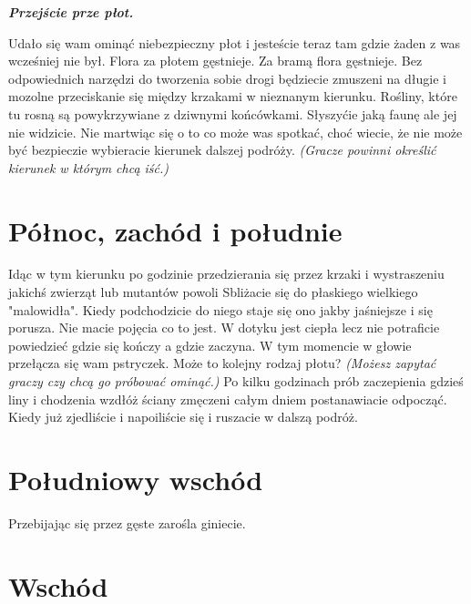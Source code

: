 \documentclass{article}
\begin{document}
    \bigskip
    \normalfont
    \emph{\textbf{Przejście prze płot.}}

    Udało się wam ominąć niebezpieczny płot i jesteście teraz tam gdzie żaden z was wcześniej nie był. Flora za płotem gęstnieje. Za bramą flora gęstnieje. Bez odpowiednich narzędzi do tworzenia sobie drogi będziecie zmuszeni na długie i mozolne przeciskanie się między krzakami w nieznanym kierunku. Rośliny, które tu rosną są powykrzywiane z dziwnymi końcówkami. Słyszyćie jaką faunę ale jej nie widzicie. Nie martwiąc się o to co może was spotkać, choć wiecie, że nie może być bezpieczie wybieracie kierunek dalszej podróży. \emph{(Gracze powinni określić kierunek w którym chcą iść.)}

    \section{Północ, zachód i południe}

    Idąc w tym kierunku po godzinie przedzierania się przez krzaki i wystraszeniu jakichś zwierząt lub mutantów powoli Sbliżacie się do płaskiego wielkiego "malowidła". Kiedy podchodzicie do niego staje się ono jakby jaśniejsze i się porusza. Nie macie pojęcia co to jest. W dotyku jest ciepła lecz nie potraficie powiedzieć gdzie się kończy a gdzie zaczyna. W tym momencie w głowie przełącza się wam pstryczek. Może to kolejny rodzaj płotu? \emph{(Możesz zapytać graczy czy chcą go próbować ominąć.)} Po kilku godzinach prób zaczepienia gdzieś liny i chodzenia wzdłóż ściany zmęczeni całym dniem postanawiacie odpocząć. Kiedy już zjedliście i napoiliście się i ruszacie w dalszą podróż.

    \section{Południowy wschód}

    Przebijając się przez gęste zarośla giniecie. 

    \section{Wschód}


    
\end{document}
